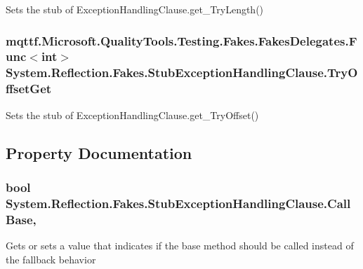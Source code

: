 Sets the stub of Exception\-Handling\-Clause.\-get\-\_\-\-Try\-Length()

\hypertarget{class_system_1_1_reflection_1_1_fakes_1_1_stub_exception_handling_clause_a8bb9a8e77b3447f15d63638e8c54bcb2}{
\subsubsection[{Try\-Offset\-Get}]{\setlength{\rightskip}{0pt plus 5cm}mqttf.\-Microsoft.\-Quality\-Tools.\-Testing.\-Fakes.\-Fakes\-Delegates.\-Func$<$int$>$ System.\-Reflection.\-Fakes.\-Stub\-Exception\-Handling\-Clause.\-Try\-Offset\-Get}}\label{class_system_1_1_reflection_1_1_fakes_1_1_stub_exception_handling_clause_a8bb9a8e77b3447f15d63638e8c54bcb2}


Sets the stub of Exception\-Handling\-Clause.\-get\-\_\-\-Try\-Offset()



\subsection{Property Documentation}
\hypertarget{class_system_1_1_reflection_1_1_fakes_1_1_stub_exception_handling_clause_aa2afe3d21b5d4d50de0eebc0cdbd67e9}{
\subsubsection[{Call\-Base}]{\setlength{\rightskip}{0pt plus 5cm}bool System.\-Reflection.\-Fakes.\-Stub\-Exception\-Handling\-Clause.\-Call\-Base\hspace{0.3cm}{\ttfamily [get]}, {\ttfamily [set]}}}\label{class_system_1_1_reflection_1_1_fakes_1_1_stub_exception_handling_clause_aa2afe3d21b5d4d50de0eebc0cdbd67e9}


Gets or sets a value that indicates if the base method should be called instead of the fallback behavior

